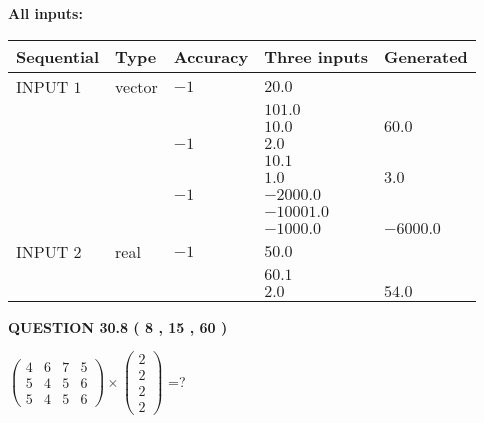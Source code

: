 \documentclass[12pt]{article}
\begin{document}
   
   
   
\noindent\vspace{0.1in}\hspace{-0.08in} {\textbf{\Large{All inputs: }}}
   
   
  
  
\noindent\begin{tabular}{|l|l|l|l|l|}
\hline
 Sequential & Type & Accuracy & Three inputs & Generated \\ 
\hline
 
 
  INPUT $            1 $ & vector & $           -1  $ & $
20.0
  $ & \\
  & & & $
101.0
  $ & \\
  & & & $
10.0
$ & $ 60.0 $ 
  \\
  & & $           -1  $ & $
2.0
  $ & \\
  & & & $
10.1
  $ & \\
  & & & $
1.0
$ & $ 3.0 $ 
  \\
  & & $           -1  $ & $
-2000.0
  $ & \\
  & & & $
-10001.0
  $ & \\
  & & & $
-1000.0
$ & $ -6000.0 $ 
 \\  \hline  
 
 
  INPUT $            2 $ & real & $           -1  $ & $
 50.0
  $ & \\
  & & &  $
 60.1
  $ & \\
  & & &  $
 2.0
 $ & $ 54.0 $ 
 \\  \hline  
 \end{tabular}
   
   
  
\vspace{0.2in}
  
{\textbf{\Large{QUESTION
30.8 
 (           8 ,          15 ,          60 )
}}}
  
  
 
$ \left( \begin{array}{ccccccccc}
           4  & 
           6  & 
           7  & 
           5  \\ 
           5  & 
           4  & 
           5  & 
           6  \\ 
           5  & 
           4  & 
           5  & 
           6
\end{array}\right) \times
\left( \begin{array}{c}
           2  \\ 
           2  \\ 
           2  \\ 
           2
\end{array}\right) $ =?
 
\end{document}
